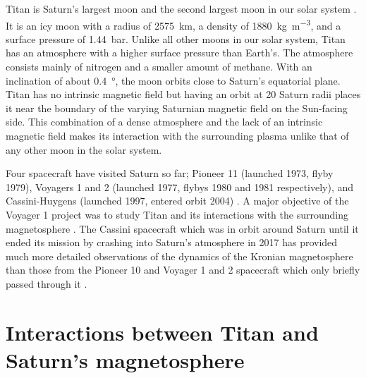 \documentclass[12pt, parskip=full*, abstract]{scrartcl}
\begin{document}
Titan is Saturn's largest moon and the second largest moon in our solar system \parencite{fundamental-planetary-science}. It is an icy moon with a radius of \SI{2575}{\kilo\metre}, a density of \SI{1880}{\kilogram\per\metre^3}, and a surface pressure of \SI{1.44}{\bar}. Unlike all other moons in our solar system, Titan has an atmosphere with a higher surface pressure than Earth's. The atmosphere consists mainly of nitrogen and a smaller amount of methane. With an inclination of about \SI{0.4}{\degree}, the moon orbits close to Saturn's equatorial plane. Titan has no intrinsic magnetic field but having an orbit at 20 Saturn radii places it near the boundary of the varying Saturnian magnetic field on the Sun-facing side. This combination of a dense atmosphere and the lack of an intrinsic magnetic field makes its interaction with the surrounding plasma unlike that of any other moon in the solar system. 

Four spacecraft have visited Saturn so far; Pioneer 11 (launched 1973, flyby 1979), Voyagers 1 and 2 (launched 1977, flybys 1980 and 1981 respectively), and Cassini-Huygens (launched 1997, entered orbit 2004) \parencite{encyclopedia-missions,cassini-2019}. A major objective of the Voyager 1 project was to study Titan and its interactions with the surrounding magnetosphere \parencite{hartle-1982}. The Cassini spacecraft which was in orbit around Saturn until it ended its mission by crashing into Saturn's atmosphere in 2017 \parencite{cassini-2019} has provided much more detailed observations of the dynamics of the Kronian magnetosphere than those from the Pioneer 10 and Voyager 1 and 2 spacecraft which only briefly passed through it \parencite{encyclopedia-magnetospheres}. 


\section{Interactions between Titan and Saturn's magnetosphere}
\end{document}
